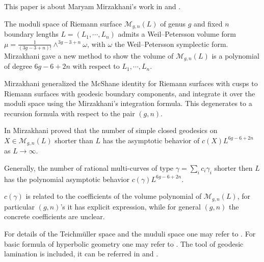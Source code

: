 This paper is about Maryam Mirzakhani’s work in \cite{Mirzakhani:2006fta} and \cite{growthofsimple}.

The moduli space of Riemann surface $\mathscr{M}_{g,n}(L)$ of  genus $g$ and fixed $n$ boundary lengths $L=(L_1,\cdots,L_n)$ admits a Weil--Petersson volume form  $\mu=\frac{1}{(3g-3+n)!}\wedge^{3g-3+n} \omega$, with $\omega$ the Weil--Petersson symplectic  form. Mirzakhani gave a new method to show the volume of $\mathscr{M}_{g,n}(L)$  is a polynomial of degree $6g-6+2n$ with respect to $L_1,\cdots,L_n$.

Mirzakhani generalized  the McShane identity\cite{McShane1998SimpleGA} for Riemann surfaces with cusps to Riemann surfaces with geodesic boundary components, and integrate it over the moduli space using  the Mirzakhani's integration formula. This degenerates to a recursion formula with respect to the pair $(g,n)$.

In \cite{growthofsimple} Mirzakhani proved that the number of simple closed geodesics on $X\in \mathscr{M}_{g,n}(L)$ shorter than $L$  has the asymptotic behavior of $c(X)L^{6g-6+2n}$ as $L\to \infty$.

Generally, the number of  rational  multi-curves of type $\gamma=\sum_ic_i\gamma_i$ shorter then $L$  has the polynomial asymptotic behavior $c(\gamma)L^{6g-6+2n}$.

$c(\gamma)$ is related to the coefficients of the volume polynomial of $\mathscr{M}_{g,n}(L)$, for particular $(g,n)$'s it has explicit
expression, while for general $(g,n)$  the concrete coefficients  are unclear.

For details of the Teichm\"uller space and the muduli space one may refer to \cite{Imayoshi1992An}. For basic formula of hyperbolic geometry one may refer to \cite{Buser}.
The tool of geodesic lamination is included, it can be referred in  \cite{traintracks} and \cite{laminations}.








 
 
 

 
  
  
  








